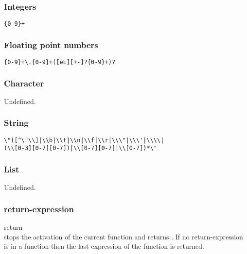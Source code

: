\documentclass[12pt]{article}
\begin{document}
\subsubsection{Integers}
\begin{lstlisting}
{0-9}+
\end{lstlisting}

\subsubsection{Floating point numbers}
\begin{lstlisting}
{0-9}+\.{0-9}+([eE][+-]?{0-9}+)?
\end{lstlisting}

\subsubsection{Character}
Undefined.

\subsubsection{String}
\begin{lstlisting}
\"([^\"\\]|\\b|\\t|\\n|\\f|\\r|\\\"|\\\'|\\\\|
(\\[0-3][0-7][0-7])|\\[0-7][0-7]|\\[0-7])*\"
\end{lstlisting}

\subsubsection{List}
Undefined.

\subsubsection{return-expression}
return \\
stops the activation of the current function and returns .
If no return-expression is in a function then the last expression of the function is returned.
\end{document}
